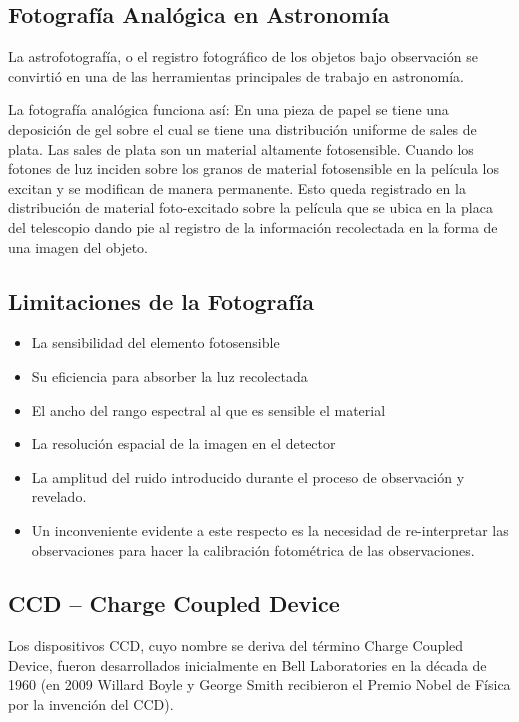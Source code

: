 \documentclass{article}
\begin{document}
\subsection{Fotografía Analógica en Astronomía}
La astrofotografía, o el registro fotográfico de los objetos bajo observación se convirtió en una de las herramientas principales de trabajo en astronomía.

La fotografía analógica funciona así: En una pieza de papel se tiene una deposición de gel sobre el cual se tiene una distribución uniforme de sales de plata. Las sales de plata son un material altamente fotosensible. Cuando los fotones de luz inciden sobre los granos de material fotosensible en la película los excitan y se modifican de manera permanente. Esto queda registrado en la distribución de material foto-excitado sobre la película que se ubica en la placa del telescopio dando pie al registro de la información recolectada en la forma de una imagen del objeto.

\subsection{Limitaciones de la Fotografía}
\begin{itemize}
    \item La sensibilidad del elemento fotosensible
    \item Su eficiencia para absorber la luz recolectada
    \item El ancho del rango espectral al que es sensible el material
    \item La resolución espacial de la imagen en el detector
    \item La amplitud del ruido introducido durante el proceso de observación y revelado.
    \item Un inconveniente evidente a este respecto es la necesidad de re-interpretar las observaciones para hacer la calibración fotométrica de las observaciones.
\end{itemize}



\subsection{CCD -- Charge Coupled Device}
Los dispositivos CCD, cuyo nombre se deriva del término Charge Coupled Device, fueron desarrollados inicialmente en Bell Laboratories en la década de 1960 (en 2009 Willard Boyle y George Smith recibieron el Premio Nobel de Física por la invención del CCD).

\end{document}
